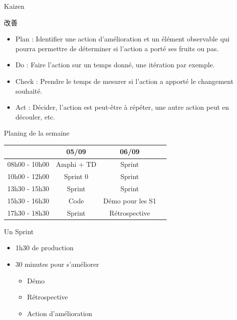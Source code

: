 \documentclass{beamer}
\begin{document}
\begin{frame}{Kaizen 
    {\begin{CJK*}{UTF8}{mj} 改善 \end{CJK*}}
  }
  
  \begin{itemize}
    \item \alert{Plan} : Identifier une action d'amélioration et un élément observable qui pourra permettre de déterminer si l'action a porté ses fruits ou pas.
    \item \alert{Do} : Faire l'action sur un temps donné, une itération par exemple.
    \item \alert{Check} : Prendre le temps de mesurer si l'action a apporté le changement souhaité.
    \item \alert{Act} : Décider, l'action est peut-être à répéter, une autre action peut en découler, etc.
  \end{itemize}

\end{frame}


\begin{frame}{Planing de la semaine}{}
  {
    \center
    \begin{tabular}{l | g | g | g  }
      & \textbf{05/09} & \textbf{06/09} \\
      \hline
      08h00 - 10h00 & Amphi + TD & Sprint \\
      \hline
      10h00 - 12h00 & Sprint 0   & Sprint \\
      \hline
      13h30 - 15h30 & Sprint     & Sprint \\
      \hline
      15h30 - 16h30 & Code       & Démo pour les S1 \\
      \hline
      17h30 - 18h30 & Sprint     & Rétrospective \\
      \hline
    \end{tabular}
  }

\end{frame}

\begin{frame}{Un Sprint}
  \begin{itemize}
    \item 1h30 de production
    \item 30 minutes pour s'améliorer
    \begin{itemize}
      \item Démo
      \item Rétrospective
      \item Action d'amélioration
    \end{itemize}
  \end{itemize}
\end{frame}
\end{document}
